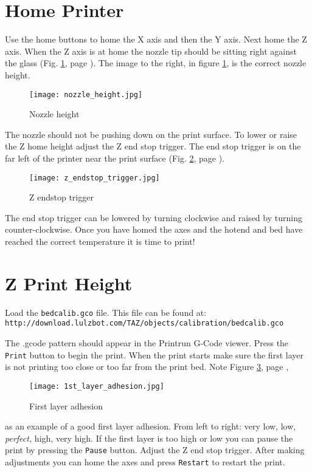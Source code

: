\section{Home Printer}
Use the home buttons to home the X axis and then the Y axis. Next home the Z axis. When the Z axis is at home the nozzle tip should be sitting right against the glass
(Fig. \ref{fig:nozzle_height}, page \pageref{fig:nozzle_height}). The image to the right, in figure \ref{fig:nozzle_height}, is the correct nozzle height.
\begin{figure}[hbt]
\centering
\texttt{[image: nozzle\_height.jpg]}
\caption{Nozzle height}
\label{fig:nozzle_height}
\end{figure}
The nozzle should not be pushing down on the print surface. To lower or raise the Z home height adjust the Z end stop trigger. The end stop trigger is on the far left of the printer near the print surface
(Fig. \ref{fig:z_endstop_trigger}, page \pageref{fig:z_endstop_trigger}).
\begin{figure}[hb!]
\centering
\texttt{[image: z\_endstop\_trigger.jpg]}
\caption{Z endstop trigger}
\label{fig:z_endstop_trigger}
\end{figure}
The end stop trigger can be lowered by turning clockwise and raised by turning counter-clockwise. Once you have homed the axes and the hotend and bed have reached the correct temperature it is time to print!

\section{Z Print Height}
Load the \texttt{bedcalib.gco} file.
This file can be found at:
\texttt{http://download.lulzbot.com/TAZ/objects/calibration/bedcalib.gco}

The .gcode pattern should appear in the Printrun G-Code viewer. Press the \texttt{Print} button to begin the print. When the print starts make sure the first layer is not printing too close or too far from the print bed. Note 
Figure \ref{fig:1st_layer_adhesion}, page \pageref{fig:1st_layer_adhesion},
\begin{figure}[hbt]
\centering
\texttt{[image: 1st\_layer\_adhesion.jpg]}
\caption{First layer adhesion}
\label{fig:1st_layer_adhesion}
\end{figure}
as an example of a good first layer adhesion. From left to right: very low, low, \emph{perfect,} high, very high. If the first layer is too high or low you can pause the print by pressing the \texttt{Pause} button. Adjust the Z end stop trigger. After making adjustments you can home the axes and press \texttt{Restart} to restart the print.

